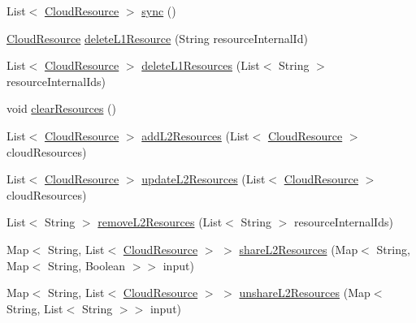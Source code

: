 \begin{DoxyCompactItemize}
\item 
List$<$ \hyperlink{classeu_1_1h2020_1_1symbiote_1_1cloud_1_1model_1_1internal_1_1CloudResource}{Cloud\+Resource} $>$ \hyperlink{interfaceeu_1_1h2020_1_1symbiote_1_1client_1_1interfaces_1_1RHClient_ae450ac97070e6968eb9d1bfcfd3ae3e6}{sync} ()
\item 
\hyperlink{classeu_1_1h2020_1_1symbiote_1_1cloud_1_1model_1_1internal_1_1CloudResource}{Cloud\+Resource} \hyperlink{interfaceeu_1_1h2020_1_1symbiote_1_1client_1_1interfaces_1_1RHClient_a9ed4582f57457a4dd4fe2bf77a6822fc}{delete\+L1\+Resource} (String resource\+Internal\+Id)
\item 
List$<$ \hyperlink{classeu_1_1h2020_1_1symbiote_1_1cloud_1_1model_1_1internal_1_1CloudResource}{Cloud\+Resource} $>$ \hyperlink{interfaceeu_1_1h2020_1_1symbiote_1_1client_1_1interfaces_1_1RHClient_a69bba5fe6031648cc2636866cfe6f103}{delete\+L1\+Resources} (List$<$ String $>$ resource\+Internal\+Ids)
\item 
void \hyperlink{interfaceeu_1_1h2020_1_1symbiote_1_1client_1_1interfaces_1_1RHClient_a24f46b3db8f8e4050885bb6cc6b03127}{clear\+Resources} ()
\item 
List$<$ \hyperlink{classeu_1_1h2020_1_1symbiote_1_1cloud_1_1model_1_1internal_1_1CloudResource}{Cloud\+Resource} $>$ \hyperlink{interfaceeu_1_1h2020_1_1symbiote_1_1client_1_1interfaces_1_1RHClient_a456f65eb2b4db26964617571d617b2ba}{add\+L2\+Resources} (List$<$ \hyperlink{classeu_1_1h2020_1_1symbiote_1_1cloud_1_1model_1_1internal_1_1CloudResource}{Cloud\+Resource} $>$ cloud\+Resources)
\item 
List$<$ \hyperlink{classeu_1_1h2020_1_1symbiote_1_1cloud_1_1model_1_1internal_1_1CloudResource}{Cloud\+Resource} $>$ \hyperlink{interfaceeu_1_1h2020_1_1symbiote_1_1client_1_1interfaces_1_1RHClient_a4db8d3650014ed2c178e5be03da8ac63}{update\+L2\+Resources} (List$<$ \hyperlink{classeu_1_1h2020_1_1symbiote_1_1cloud_1_1model_1_1internal_1_1CloudResource}{Cloud\+Resource} $>$ cloud\+Resources)
\item 
List$<$ String $>$ \hyperlink{interfaceeu_1_1h2020_1_1symbiote_1_1client_1_1interfaces_1_1RHClient_a8957be63f35e866513383cd20452a374}{remove\+L2\+Resources} (List$<$ String $>$ resource\+Internal\+Ids)
\item 
Map$<$ String, List$<$ \hyperlink{classeu_1_1h2020_1_1symbiote_1_1cloud_1_1model_1_1internal_1_1CloudResource}{Cloud\+Resource} $>$ $>$ \hyperlink{interfaceeu_1_1h2020_1_1symbiote_1_1client_1_1interfaces_1_1RHClient_ab033d6b4967030ca4d63f8186b147a88}{share\+L2\+Resources} (Map$<$ String, Map$<$ String, Boolean $>$$>$ input)
\item 
Map$<$ String, List$<$ \hyperlink{classeu_1_1h2020_1_1symbiote_1_1cloud_1_1model_1_1internal_1_1CloudResource}{Cloud\+Resource} $>$ $>$ \hyperlink{interfaceeu_1_1h2020_1_1symbiote_1_1client_1_1interfaces_1_1RHClient_a0570ca0fb6285f0e9900429c93a83de3}{unshare\+L2\+Resources} (Map$<$ String, List$<$ String $>$$>$ input)
\end{DoxyCompactItemize}


